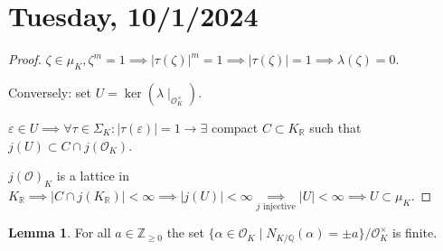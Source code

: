 \documentclass[openany]{amsbook}
\numberwithin{section}{chapter}
\theoremstyle{definition}
\newtheorem{lemma}[theorem]{Lemma}
\begin{document}
\section*{Tuesday, 10/1/2024}

\begin{proof}
    \(\zeta \in \mu _K, \zeta ^ m = 1 \implies \vert \tau (\zeta) \vert ^ m = 1 \implies \vert \tau (\zeta) \vert = 1 \implies \lambda (\zeta) = 0\).

    Conversely: set \(U = \ker (\lambda \mid_{\mathcal{O}_K^\times})\).

    \(\varepsilon \in U \implies \forall \tau \in \Sigma_K: \vert \tau (\varepsilon) \vert = 1 \to \exists \) compact \(C \subset K_\mathbb{R}\) such that \(j(U) \subset C \cap j(\mathcal{O}_K)\).

    \(j(\mathcal{O})_K\) is a lattice in \(K_\mathbb{R} \implies \vert C \cap j(K_\mathbb{R}) \vert < \infty \implies \vert j(U) \vert < \infty \underset{j \text{ injective} }{\implies} \vert U \vert < \infty \implies U \subset \mu_K\).

\end{proof}

\begin{lemma}
    For all \(a\in \mathbb{Z} _{\geq 0}\) the set \(\{ \alpha \in \mathcal{O}_K \mid N_{K / \mathbb{Q}}(\alpha) = \pm a \} / \mathcal{O}_K ^ \times \) is finite.
\end{lemma}
    
\end{document}
